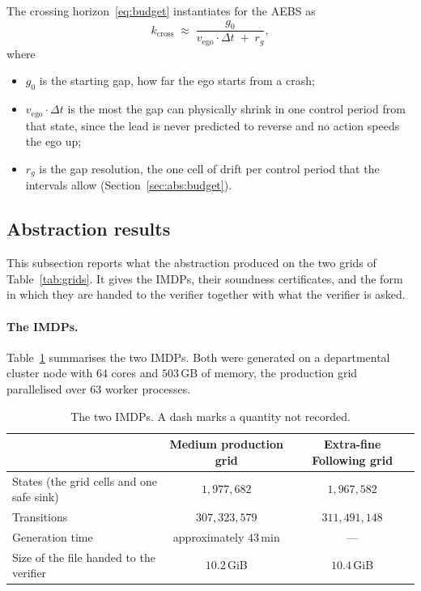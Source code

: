 \documentclass[11pt,a4paper]{article}
\newcommand{\dt}{\Delta t}
\newcommand{\vego}{v_{\text{ego}}}
\theoremstyle{plain}
\theoremstyle{remark}
\begin{document}
	The crossing horizon~\eqref{eq:budget} instantiates for the AEBS as
	\begin{equation}
		k_{\text{cross}} \;\approx\; \frac{g_0}{\vego \cdot \dt \;+\; r_g},
		\label{eq:budgetaebs}
	\end{equation}
	where
	\begin{itemize}
		\item $g_0$ is the starting gap, how far the ego starts from a crash;
		\item $\vego \cdot \dt$ is the most the gap can physically shrink in one control period from that state, since the lead is never predicted to reverse and no action speeds the ego up;
		\item $r_g$ is the gap resolution, the one cell of drift per control period that the intervals allow (Section~\ref{sec:abs:budget}).
	\end{itemize}
	
	\subsection{Abstraction results}
	\label{sec:cs:exp}
	
	This subsection reports what the abstraction produced on the two grids of Table~\ref{tab:grids}. It gives the IMDPs, their soundness certificates, and the form in which they are handed to the verifier together with what the verifier is asked.
	
	\paragraph{The IMDPs.}
	Table~\ref{tab:absres} summarises the two IMDPs. Both were generated on a departmental cluster node with $64$ cores and $503$\,GB of memory, the production grid parallelised over $63$ worker processes.
	
	\begin{table}[H]
		\centering
		\small
		\begin{tabular}{lcc}
			\toprule
			& Medium production grid & Extra-fine Following grid \\
			\midrule
			States (the grid cells and one safe sink) & $1{,}977{,}682$ & $1{,}967{,}582$ \\
			Transitions & $307{,}323{,}579$ & $311{,}491{,}148$ \\
			Generation time & approximately $43$\,min & --- \\
			Size of the file handed to the verifier & $10.2$\,GiB & $10.4$\,GiB \\
			\bottomrule
		\end{tabular}
		\caption{The two IMDPs. A dash marks a quantity not recorded.}
		\label{tab:absres}
	\end{table}
	
\end{document}
